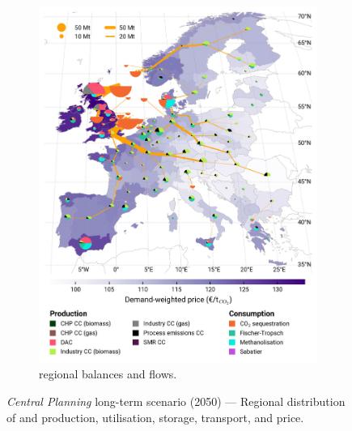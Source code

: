 \documentclass[final,5p,times,twocolumn,sort&compress]{elsarticle}
\begin{document}
\begin{figure}[htbp]
\begin{subfigure}[t]{0.49\textwidth}
      \includegraphics[width=1\textwidth]{maps/greenfield-pipelines/base_s_adm___2050-balance_map_co2_stored} 
      \vspace{-0.7cm}
      \caption{ regional balances and flows.}
      \label{fig:CP_lt_2050_co2}
  \end{subfigure}
  \caption{\textit{Central Planning} long-term scenario (2050) --- Regional distribution of  and  production, utilisation, storage, transport, and price.}
  \label{fig:CP_lt_2050}
\end{figure}

\clearpage
 

\end{document}
